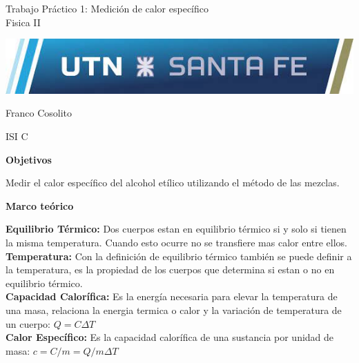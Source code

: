 \documentclass[11pt, letterpaper]{article}
\newcommand\vspt{15pt}
\newcommand\vsp{10pt}
\newcommand\tpn{1}
\newcommand\tptitle{Medición de calor específico}
\newcommand\tpsubj{Fisica II}
\begin{document}
\thispagestyle{empty}

\begin{center}\Huge{Trabajo Práctico \tpn: \tptitle\\
\vspace{\vspt}
\tpsubj}\end{center}

\vspace{\vspt}
\includegraphics[width=\linewidth]{utnlogo}

\vspace{\vspt}
\begin{center}\Huge{Franco Cosolito}\end{center}

\vspace{\vspt}
\begin{center}\Large{ISI C}\end{center}
\pagebreak

\setcounter{page}{1}
\begin{center}\textbf{Objetivos}\end{center}
Medir el calor específico del alcohol etílico
 utilizando el método de las mezclas.\\
\vspace{\vsp}

\begin{center}\textbf{Marco teórico}\end{center}
\textbf{Equilibrio Térmico:} Dos cuerpos estan en equilibrio térmico 
si y solo si tienen la misma temperatura. Cuando esto ocurre
no se transfiere mas calor entre ellos.\\
\textbf{Temperatura:} Con la definición de equilibrio térmico
también se puede definir a la temperatura, es la propiedad de
los cuerpos que determina si estan o no en equilibrio 
térmico.\\
\textbf{Capacidad Calorífica:} Es la energía necesaria para elevar 
la temperatura de una masa, relaciona la energia termica
o calor y la variación de temperatura de un cuerpo:
$ Q = C \Delta T $\\
\textbf{Calor Específico:} Es la capacidad calorífica de una 
sustancia por unidad de masa: 
$ c = C/m = Q/{m \Delta T } $
\vspace{\vsp}
\end{document}
